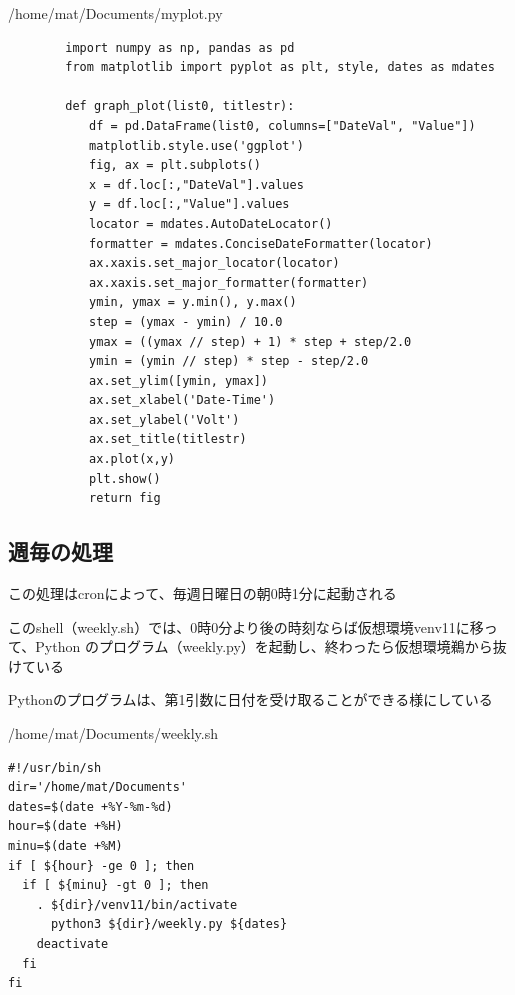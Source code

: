\documentclass[12pt,a4j]{jsbook}
\begin{document}
\begin{spacing}{0.95}
\begin{itembox}[l]{/home/mat/Documents/myplot.py}
\begin{verbatim}
		import numpy as np, pandas as pd
		from matplotlib import pyplot as plt, style, dates as mdates

		def graph_plot(list0, titlestr):
		　　df = pd.DataFrame(list0, columns=["DateVal", "Value"])
		　　matplotlib.style.use('ggplot')
		　　fig, ax = plt.subplots()
		　　x = df.loc[:,"DateVal"].values
		　　y = df.loc[:,"Value"].values
		　　locator = mdates.AutoDateLocator()
		　　formatter = mdates.ConciseDateFormatter(locator)
		　　ax.xaxis.set_major_locator(locator)
		　　ax.xaxis.set_major_formatter(formatter)
		　　ymin, ymax = y.min(), y.max()
		　　step = (ymax - ymin) / 10.0
		　　ymax = ((ymax // step) + 1) * step + step/2.0
		　　ymin = (ymin // step) * step - step/2.0
		　　ax.set_ylim([ymin, ymax])
		　　ax.set_xlabel('Date-Time')
		　　ax.set_ylabel('Volt')
		　　ax.set_title(titlestr)
		　　ax.plot(x,y)
		　　plt.show()
		　　return fig
\end{verbatim}
\end{itembox}
\end{spacing}


\newpage

\subsection{週毎の処理}

この処理はcronによって、毎週日曜日の朝0時1分に起動される

このshell（weekly.sh）では、0時0分より後の時刻ならば仮想環境venv11に移って、Python のプログラム（weekly.py）を起動し、終わったら仮想環境鵜から抜けている

Pythonのプログラムは、第1引数に日付を受け取ることができる様にしている

\begin{spacing}{0.95}
\begin{itembox}[l]{/home/mat/Documents/weekly.sh}
\begin{verbatim}
#!/usr/bin/sh
dir='/home/mat/Documents'
dates=$(date +%Y-%m-%d)
hour=$(date +%H)
minu=$(date +%M)
if [ ${hour} -ge 0 ]; then
  if [ ${minu} -gt 0 ]; then
    . ${dir}/venv11/bin/activate
      python3 ${dir}/weekly.py ${dates}
    deactivate
  fi
fi
\end{verbatim}
\end{itembox}
\end{spacing}
\end{document}
